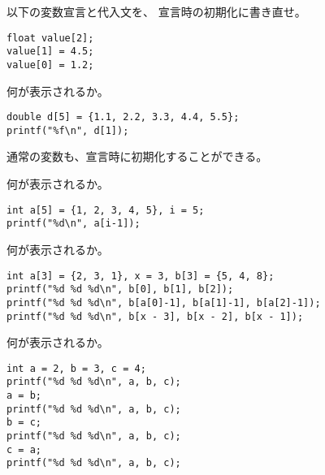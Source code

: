\documentclass[12pt,a4j]{jarticle}
\newcounter{toi}
\def\toi{%
\bigskip\bigskip\noindent
\addtocounter{toi}{1}
\shadowbox{\bfseries\large 問\thetoi}
\nopagebreak[4]\bigskip\nopagebreak[4]
}
\begin{document}


\toi

以下の変数宣言と代入文を、
宣言時の初期化に書き直せ。

\begin{verbatim}
float value[2];
value[1] = 4.5;
value[0] = 1.2;
\end{verbatim}



\toi

何が表示されるか。
\begin{verbatim}
double d[5] = {1.1, 2.2, 3.3, 4.4, 5.5};
printf("%f\n", d[1]);
\end{verbatim}





\toi
通常の変数も、宣言時に初期化することができる。

何が表示されるか。
\begin{verbatim}
int a[5] = {1, 2, 3, 4, 5}, i = 5;
printf("%d\n", a[i-1]);
\end{verbatim}






\toi

何が表示されるか。
\begin{verbatim}
int a[3] = {2, 3, 1}, x = 3, b[3] = {5, 4, 8};
printf("%d %d %d\n", b[0], b[1], b[2]);
printf("%d %d %d\n", b[a[0]-1], b[a[1]-1], b[a[2]-1]);
printf("%d %d %d\n", b[x - 3], b[x - 2], b[x - 1]);
\end{verbatim}






\toi

何が表示されるか。
\begin{verbatim}
int a = 2, b = 3, c = 4;
printf("%d %d %d\n", a, b, c);
a = b;
printf("%d %d %d\n", a, b, c);
b = c;
printf("%d %d %d\n", a, b, c);
c = a;
printf("%d %d %d\n", a, b, c);
\end{verbatim}
\end{document}

